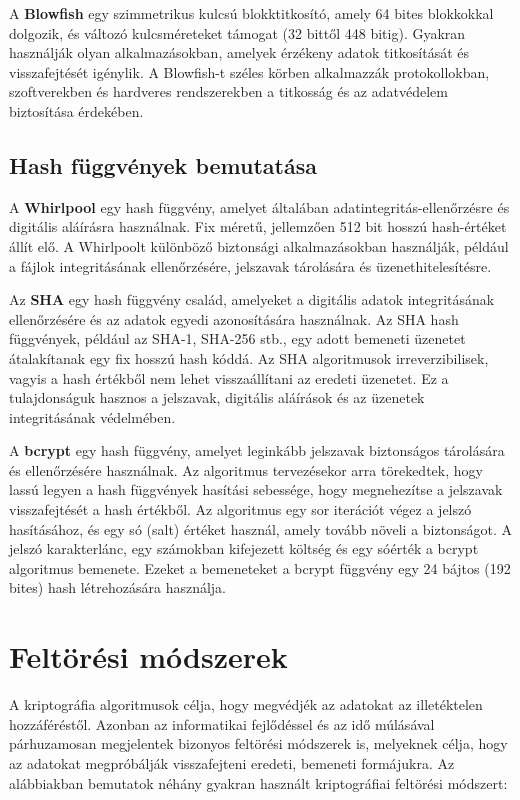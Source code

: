 A \textbf{Blowfish} egy szimmetrikus kulcsú blokktitkosító, amely 64 bites blokkokkal dolgozik, és változó kulcsméreteket támogat (32 bittől 448 bitig). Gyakran használják olyan alkalmazásokban, amelyek érzékeny adatok titkosítását és visszafejtését igénylik. A Blowfish-t széles körben alkalmazzák protokollokban, szoftverekben és hardveres rendszerekben a titkosság és az adatvédelem biztosítása érdekében. \cite{Blowfish}


\subsection {Hash függvények bemutatása}
A \textbf{Whirlpool} egy hash függvény, amelyet általában adatintegritás-ellenőrzésre és digitális aláírásra használnak. Fix méretű, jellemzően 512 bit hosszú hash-értéket állít elő. A Whirlpoolt különböző biztonsági alkalmazásokban használják, például a fájlok integritásának ellenőrzésére, jelszavak tárolására és üzenethitelesítésre. \cite{Whirlpool}

Az \textbf{SHA} egy hash függvény család, amelyeket a digitális adatok integritásának ellenőrzésére és az adatok egyedi azonosítására használnak. Az SHA hash függvények, például az SHA-1, SHA-256 stb., egy adott bemeneti üzenetet átalakítanak egy fix hosszú hash kóddá. Az SHA algoritmusok irreverzibilisek, vagyis a hash értékből nem lehet visszaállítani az eredeti üzenetet. Ez a tulajdonságuk hasznos a jelszavak, digitális aláírások és az üzenetek integritásának védelmében.

A \textbf{bcrypt} egy hash függvény, amelyet leginkább jelszavak biztonságos tárolására és ellenőrzésére használnak. Az algoritmus tervezésekor arra törekedtek, hogy lassú legyen a hash függvények hasítási sebessége, hogy megnehezítse a jelszavak visszafejtését a hash értékből. Az algoritmus egy sor iterációt végez a jelszó hasításához, és egy só (salt) értéket használ, amely tovább növeli a biztonságot. A jelszó karakterlánc, egy számokban kifejezett költség és egy sóérték a bcrypt algoritmus bemenete. Ezeket a bemeneteket a bcrypt függvény egy 24 bájtos (192 bites) hash létrehozására használja. \cite{bcrypt}

\section{Feltörési módszerek}
A kriptográfia algoritmusok célja, hogy megvédjék az adatokat az illetéktelen hozzáféréstől. Azonban az informatikai fejlődéssel és az idő múlásával párhuzamosan megjelentek bizonyos feltörési módszerek is, melyeknek célja, hogy az adatokat megpróbálják visszafejteni eredeti, bemeneti formájukra. Az alábbiakban bemutatok néhány gyakran használt kriptográfiai feltörési módszert:

